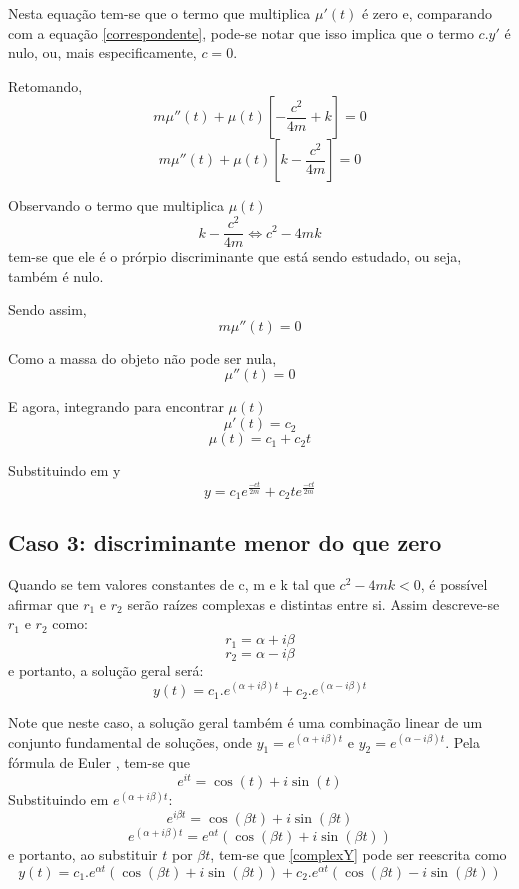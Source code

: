 \documentclass[12pt]{article}
\begin{document}
Nesta equação tem-se que o termo que multiplica $\mu '(t)$ é zero e, comparando com a equação \ref{correspondente}, pode-se
notar que isso implica que o termo $c.y'$ é  nulo, ou, mais especificamente, $c=0$. 

Retomando,
\[m\mu ''(t) + \mu (t) [ - \frac{c^2}{4m} + k] = 0\]
\[m\mu ''(t) + \mu (t) [k - \frac{c^2}{4m}] = 0\]

Observando o termo que multiplica $\mu(t)$
\[ k - \frac{c^2}{4m} \Leftrightarrow c^2 - 4mk\]
tem-se que ele é o prórpio discriminante que está sendo estudado, ou seja, também é nulo.

Sendo assim, 
\[m\mu ''(t) = 0\]

Como a massa do objeto não pode ser nula,
\[\mu ''(t) = 0\]

E agora, integrando para encontrar $\mu(t)$
\[\mu '(t) = c_2\]
\[\mu (t) = c_1 + c_2t\]

Substituindo em y
\[ y= c_1e^{\frac{-ct}{2m}} + c_2te^{\frac{-ct}{2m}}\]

\subsection{Caso 3: discriminante menor do que zero}

Quando se tem valores constantes de c, m e k tal que $c^2 - 4mk < 0$, é possível afirmar que 
$r_1$ e $r_2$ serão raízes complexas e distintas entre si. Assim descreve-se $r_1$ e $r_2$ como:
\[ r_1 = \alpha + i\beta\] 
\[ r_2 = \alpha - i\beta\] 
e portanto, a solução geral será:
\begin{equation}
    \label{complexY}
    y(t) = c_1.e^{(\alpha + i\beta)t} + c_2.e^{(\alpha - i\beta)t}
\end{equation}

Note que neste caso, a solução geral também é uma combinação linear de um conjunto fundamental de soluções,
onde $y_1 = e^{(\alpha + i\beta)t}$ e $y_2 = e^{(\alpha - i\beta)t}$.
Pela fórmula de Euler \cite{boyce10}, tem-se que 
\[ e^{it}= \cos(t) + i \sin(t)\] 
Substituindo em $e^{(\alpha + i\beta)t}$:
\[e^{i\beta t} = \cos(\beta t) + i \sin(\beta t)\] 
\[e^{(\alpha + i\beta)t} = e^{\alpha t}(\cos(\beta t) + i \sin(\beta t))\] 
e portanto, ao substituir $t$ por $\beta t$, tem-se que \ref{complexY} pode ser reescrita como
\begin{equation}
    y(t) = c_1.e^{\alpha t}(\cos(\beta t) + i \sin(\beta t)) + c_2.e^{\alpha t}(\cos(\beta t) - i \sin(\beta t))
    \label{solucao}
\end{equation}
\end{document}
